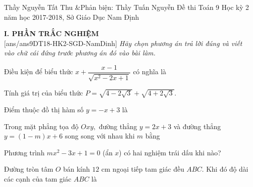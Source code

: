 \begin{name}
{Thầy  Nguyễn Tất Thu \&Phản biện: Thầy Tuấn Nguyễn}
{Đề thi Toán 9 Học kỳ 2 năm học 2017-2018, Sở Giáo Dục Nam Định}
\end{name}
\noindent\textbf{I. PHẦN TRẮC NGHIỆM} \hfill \\
\setcounter{ex}{0}
[ans/ans9DT18-HK2-SGD-NamDinh]
\textit{Hãy chọn phương án trả lời đúng và viết vào chữ cái đứng trước phương án đó vào bài làm.}
\begin{ex}%
Điều kiện để biểu thức $x+\dfrac{x-1}{\sqrt{x^2-2x+1}}$ có nghĩa là
\end{ex}
\begin{ex}%
Tính giá trị của biểu thức $P=\sqrt{4-2\sqrt{3}}+\sqrt{4+2\sqrt{3}}.$
\end{ex}
\begin{ex}%
Điểm thuộc đồ thị hàm số $y=-x+3$ là
\end{ex}
\begin{ex}%
Trong mặt phẳng tọa độ $Oxy,$ đường thẳng $y=2x+3$ và đường thẳng $y=(1-m)x+6$ song song với nhau khi $m$ bằng
\end{ex}
\begin{ex}%
Phương trình $mx^2-3x+1=0$ (ẩn $x$) có hai nghiệm trái dấu khi nào?
\end{ex}
\begin{ex}%
Đường tròn tâm $O$ bán kính $12$ cm ngoại tiếp tam giác đều $ABC$. Khi đó độ dài các cạnh của tam giác $ABC$ là 
\end{ex}

